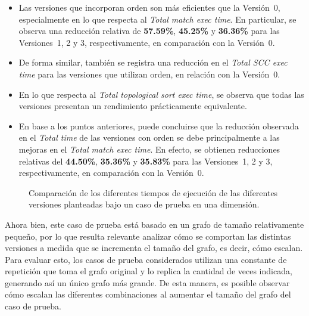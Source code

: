\begin{itemize}
    \item Las versiones que incorporan orden son más eficientes que la Versión~0, especialmente en lo que respecta al \textit{Total match exec time}. En particular, se observa una reducción relativa de \textbf{57{.}59\%}, \textbf{45{.}25\%} y \textbf{36{.}36\%} para las Versiones~1, 2 y 3, respectivamente, en comparación con la Versión~0.

    \item De forma similar, también se registra una reducción en el \textit{Total SCC exec time} para las versiones que utilizan orden, en relación con la Versión~0.

    \item En lo que respecta al \textit{Total topological sort exec time}, se observa que todas las versiones presentan un rendimiento prácticamente equivalente.

    \item En base a los puntos anteriores, puede concluirse que la reducción observada en el \textit{Total time} de las versiones con orden se debe principalmente a las mejoras en el \textit{Total match exec time}. En efecto, se obtienen reducciones relativas del \textbf{44{.}50\%}, \textbf{35{.}36\%} y \textbf{35{.}83\%} para las Versiones~1, 2 y 3, respectivamente, en comparación con la Versión~0.
\end{itemize}


\begin{figure}[htbp]
  \centering
  \caption{Comparación de los diferentes tiempos de ejecución de las diferentes versiones planteadas bajo un caso de prueba en una dimensión.}
  \label{fig:caso-1dim-general}
\end{figure}


Ahora bien, este caso de prueba está basado en un grafo de tamaño relativamente pequeño, por lo que resulta relevante analizar cómo se comportan las distintas versiones a medida que se incrementa el tamaño del grafo, es decir, cómo escalan.
Para evaluar esto, los casos de prueba considerados utilizan una constante de repetición que toma el grafo original y lo replica la cantidad de veces indicada, generando así un único grafo más grande. De esta manera, es posible observar cómo escalan las diferentes combinaciones al aumentar el tamaño del grafo del caso de prueba.

